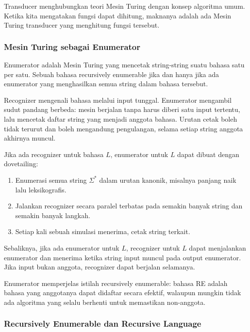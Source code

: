 Transducer menghubungkan teori Mesin Turing dengan konsep algoritma umum. Ketika kita mengatakan fungsi dapat dihitung, maknanya adalah ada Mesin Turing transducer yang menghitung fungsi tersebut.

\subsubsection{Mesin Turing sebagai Enumerator}

\begin{jawab}
Enumerator adalah Mesin Turing yang mencetak string-string suatu bahasa satu per satu. Sebuah bahasa recursively enumerable jika dan hanya jika ada enumerator yang menghasilkan semua string dalam bahasa tersebut.
\end{jawab}

Recognizer mengenali bahasa melalui input tunggal. Enumerator mengambil sudut pandang berbeda: mesin berjalan tanpa harus diberi satu input tertentu, lalu mencetak daftar string yang menjadi anggota bahasa. Urutan cetak boleh tidak terurut dan boleh mengandung pengulangan, selama setiap string anggota akhirnya muncul.

Jika ada recognizer untuk bahasa $L$, enumerator untuk $L$ dapat dibuat dengan dovetailing:
\begin{enumerate}
    \item Enumerasi semua string $\Sigma^*$ dalam urutan kanonik, misalnya panjang naik lalu leksikografis.
    \item Jalankan recognizer secara paralel terbatas pada semakin banyak string dan semakin banyak langkah.
    \item Setiap kali sebuah simulasi menerima, cetak string terkait.
\end{enumerate}

Sebaliknya, jika ada enumerator untuk $L$, recognizer untuk $L$ dapat menjalankan enumerator dan menerima ketika string input muncul pada output enumerator. Jika input bukan anggota, recognizer dapat berjalan selamanya.

Enumerator memperjelas istilah recursively enumerable: bahasa RE adalah bahasa yang anggotanya dapat didaftar secara efektif, walaupun mungkin tidak ada algoritma yang selalu berhenti untuk memastikan non-anggota.

\subsubsection{Recursively Enumerable dan Recursive Language}

